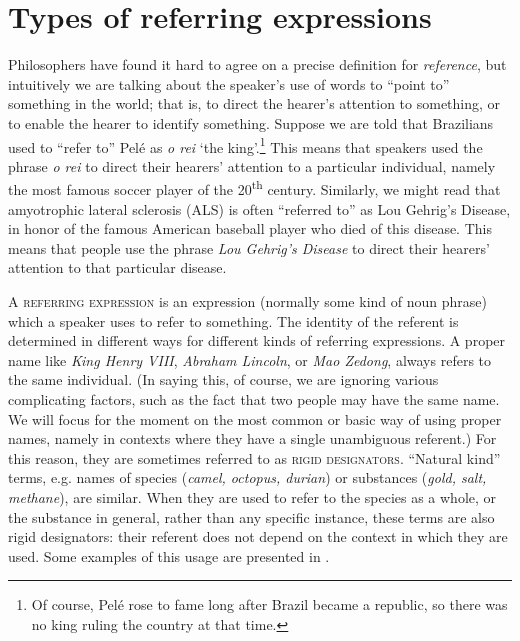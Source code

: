 \section{Types of referring expressions}\label{sec:2.3}

Philosophers have found it hard to agree on a precise definition for \textit{reference}, but intuitively we are talking about the speaker’s use of words to “point to” something in the world; that is, to direct the hearer’s attention to something, or to enable the hearer to identify something. Suppose we are told that Brazilians used to “refer to” Pelé as \textit{o rei} ‘the king’.\footnote{Of course, Pelé rose to fame long after Brazil became a republic, so there was no king ruling the country at that time.} This means that speakers used the phrase \textit{o rei} to direct their hearers’ attention to a particular individual, namely the most famous soccer player of the 20\textsuperscript{th} century. Similarly, we might read that amyotrophic lateral sclerosis (ALS) is often “referred to” as Lou Gehrig’s Disease, in honor of the famous American baseball player who died of this disease. This means that people use the phrase \textit{Lou Gehrig’s Disease} to direct their hearers’ attention to that particular disease.


\begin{sloppypar}
A \textsc{referring expression} is an expression (normally some kind of noun phrase) which a speaker uses to refer to something. The identity of the referent is determined in different ways for different kinds of referring expressions. A proper name like \textit{King Henry VIII}, \textit{Abraham Lincoln}, or \textit{Mao Zedong}, always refers to the same individual. (In saying this, of course, we are ignoring various complicating factors, such as the fact that two people may have the same name. We will focus for the moment on the most common or basic way of using proper names, namely in contexts where they have a single unambiguous referent.) For this reason, they are sometimes referred to as \textsc{rigid designators}. “Natural kind” terms, e.g. names of species (\textit{camel, octopus, durian}) or substances (\textit{gold, salt, methane}), are similar. When they are used to refer to the species as a whole, or the substance in general, rather than any specific instance, these terms are also rigid designators: their referent does not depend on the context in which they are used. Some examples of this usage are presented in .
\end{sloppypar}


